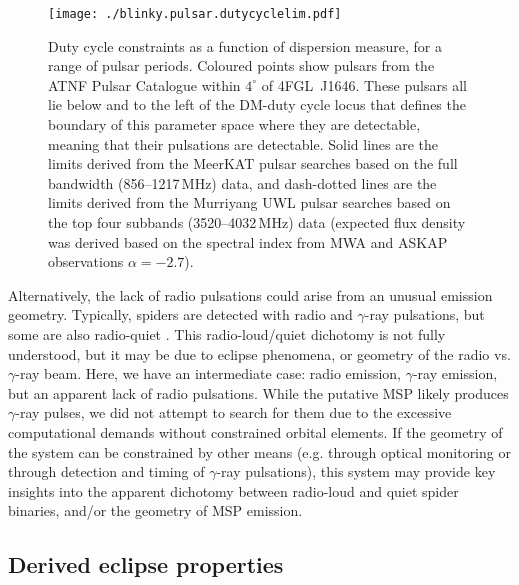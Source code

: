 \documentclass[fleqn,usenatbib]{mnras}
\newcommand{\todo}[1]{\textcolor{red}{TODO: #1}\PackageWarning{TODO:}{#1!}}
\newcommand{\blinky}{{4FGL}~J1646}
\begin{document}
\begin{figure}
    \centering
    \texttt{[image: ./blinky.pulsar.dutycyclelim.pdf]}
    \caption{Duty cycle constraints as a function of dispersion measure, for a range of pulsar periods. Coloured points show pulsars from the ATNF Pulsar Catalogue \citep{2005AJ....129.1993M} within $4^\circ$ of \blinky. These pulsars all lie below and to the left of the DM-duty cycle locus that defines the boundary of this parameter space where they are detectable, meaning that their pulsations are detectable. %
    Solid lines are the limits derived from the MeerKAT pulsar searches based on the full bandwidth (856--1217\,MHz) data, and dash-dotted lines are the limits derived from the Murriyang UWL pulsar searches based on the top four subbands (3520--4032\,MHz) data (expected flux density was derived based on the spectral index from MWA and ASKAP observations $\alpha=-2.7$).
    }
    \label{fig:dutycycle}
\end{figure}

Alternatively, the lack of radio pulsations could arise from an unusual emission geometry. Typically, spiders are detected with radio and $\gamma$-ray pulsations, but some are also radio-quiet \citep{2012ApJ...747L...3K,2022ApJ...935....2C}. This radio-loud/quiet dichotomy is not fully understood, but it may be due to eclipse phenomena, or geometry of the radio vs. $\gamma$-ray beam. Here, we have an intermediate case: radio emission, $\gamma$-ray emission, but an apparent lack of radio pulsations. While the putative MSP likely produces $\gamma$-ray pulses, we did not attempt to search for them due to the excessive computational demands without constrained orbital elements. If the geometry of the system can be constrained by other means (e.g. through optical monitoring or through detection and timing of $\gamma$-ray pulsations), this system may provide key insights into the apparent dichotomy between radio-loud and quiet spider binaries, and/or the geometry of MSP emission.






\subsection{Derived eclipse properties}
\label{subsec:ecl_props}
\end{document}
